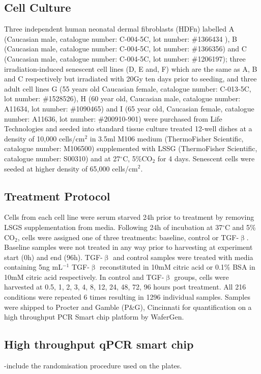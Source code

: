 \documentclass[alpha-refs]{wiley-article}
\newcommand{\tgf}{TGF-$\upbeta$}
\begin{document}
\subsection{Cell Culture}
Three independent human neonatal dermal fibroblasts (HDFn) labelled A (Caucasian male, catalogue number: C-004-5C, lot number: \#1366434 ), B (Caucasian male, catalogue number: C-004-5C, lot number: \#1366356) and C (Caucasian male, catalogue number: C-004-5C, lot number: \#1206197); three irradiation-induced senescent cell lines (D, E and, F) which are the same as A, B and C respectively but irradiated with 20Gy ten days prior to seeding, and three adult cell lines G (55 years old Caucasian female, catalogue number: C-013-5C, lot number: \#1528526), H (60 year old, Caucasian male, catalogue number: A11634, lot number: \#1090465) and I (65 year old, Caucasian female, catalogue number: A11636, lot number: \#200910-901) were purchased from Life Technologies and seeded into standard tissue culture treated 12-well dishes at a density of 10,000 cells/cm$^2$ in 3.5ml M106 medium (ThermoFisher Scientific, catalogue number: M106500) supplemented with LSSG (ThermoFisher Scientific, catalogue number: S00310) and at 27$^{\circ}$C, 5\%CO$_2$ for 4 days. Senescent cells were seeded at higher density of 65,000 cells/cm$^2$.
%
\subsection{Treatment Protocol}
Cells from each cell line were serum starved 24h prior to treatment by removing LSGS supplementation from media. Following 24h of incubation at 37$^{\circ}$C and 5\% CO$_2$, cells were assigned one of three treatments: baseline, control or \tgf{}. Baseline samples were not treated in any way prior to harvesting at experiment start (0h) and end (96h). \tgf{} and control samples were treated with media containing 5ng mL$^{-1}$ \tgf{} reconstituted in 10mM citric acid or 0.1\% BSA in 10mM citric acid respectively. In control and \tgf{} groups, cells were harvested at 0.5, 1, 2, 3, 4, 8, 12, 24, 48, 72, 96 hours post treatment. All 216 conditions were repeated 6 times resulting in 1296 individual samples. Samples were shipped to Procter and Gamble (P\&G), Cincinnati for quantification on a high throughput PCR Smart chip platform by WaferGen.

\subsection{High throughput qPCR smart chip}
-include the randomisation procedure used on the plates. 
\end{document}
